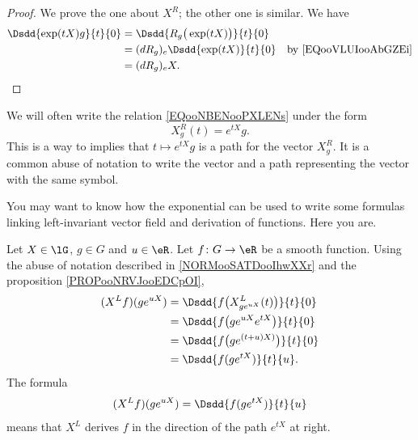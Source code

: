 \begin{proof}
	We prove the one about \( X^R\); the other one is similar. We have
	\begin{subequations}
		\begin{align}
			\Dsdd{ \exp(tX)g }{t}{0} & =\Dsdd{ R_g\big( \exp(tX) \big) }{t}{0}                                      \\
			                         & =(dR_g)_e\Dsdd{ \exp(tX) }{t}{0}        & \text{by \eqref{EQooVLUIooAbGZEi}} \\
			                         & =(dR_g)_eX.
		\end{align}
	\end{subequations}
\end{proof}

\begin{normaltext}      \label{NORMooSATDooIhwXXr}
	We will often write the relation \eqref{EQooNBENooPXLENs} under the form
	\begin{equation}
		X^R_g(t)= e^{tX}g.
	\end{equation}
	This is a way to implies that \( t\mapsto  e^{tX}g\) is a path for the vector \( X^R_g\). It is a common abuse of notation to write the vector and a path representing the vector with the same symbol.
\end{normaltext}


You may want to know how the exponential can be used to write some formulas linking left-invariant vector field and derivation of functions. Here you are.

\begin{normaltext}
	Let \( X\in \lG\), \( g\in G\) and \( u\in \eR\). Let \( f\colon G\to \eR\) be a smooth function. Using the abuse of notation described in \ref{NORMooSATDooIhwXXr} and the proposition \ref{PROPooNRVJooEDCpOI},
	\begin{subequations}
		\begin{align}
			(X^Lf)(g e^{uX}) & =\Dsdd{ f\big( X^L_{g e^{uX}}(t) \big) }{t}{0} \\
			                 & =\Dsdd{ f\big( g e^{uX} e^{tX} \big) }{t}{0}   \\
			                 & =\Dsdd{ f\big( g e^{(t+u)X)} \big)}{t}{0}      \\
			                 & =\Dsdd{ f(g e^{tX}) }{t}{u}.
		\end{align}
	\end{subequations}
	The formula
	\begin{equation}
		(X^Lf)(g e^{uX})=\Dsdd{ f(g e^{tX}) }{t}{u}
	\end{equation}
	means that \( X^L\) derives \( f\) in the direction of the path \(  e^{tX}\) at right.
\end{normaltext}

